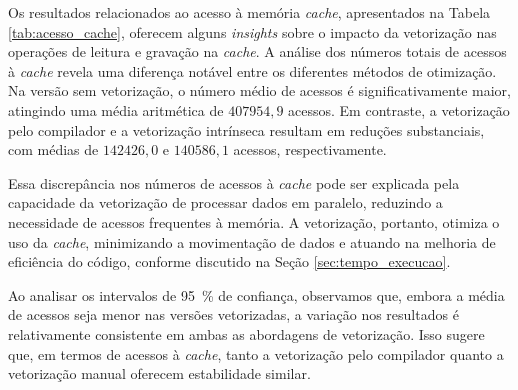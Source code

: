 \documentclass[12pt,a4paper]{article}
\begin{document}
Os resultados relacionados ao acesso à memória \textit{cache}, apresentados na Tabela \ref{tab:acesso_cache}, oferecem alguns \textit{insights} sobre o impacto da vetorização nas operações de leitura e gravação na \textit{cache}. A análise dos números totais de acessos à \textit{cache} revela uma diferença notável entre os diferentes métodos de otimização. Na versão sem vetorização, o número médio de acessos é significativamente maior, atingindo uma média aritmética de $407954,9$ acessos. Em contraste, a vetorização pelo compilador e a vetorização intrínseca resultam em reduções substanciais, com médias de $142426,0$ e $140586,1$ acessos, respectivamente.

Essa discrepância nos números de acessos à \textit{cache} pode ser explicada pela capacidade da vetorização de processar dados em paralelo, reduzindo a necessidade de acessos frequentes à memória. A vetorização, portanto, otimiza o uso da \textit{cache}, minimizando a movimentação de dados e atuando na melhoria de eficiência do código, conforme discutido na Seção \ref{sec:tempo_execucao}.

Ao analisar os intervalos de \SI{95}{\percent} de confiança, observamos que, embora a média de acessos seja menor nas versões vetorizadas, a variação nos resultados é relativamente consistente em ambas as abordagens de vetorização. Isso sugere que, em termos de acessos à \textit{cache}, tanto a vetorização pelo compilador quanto a vetorização manual oferecem estabilidade similar.
\end{document}
